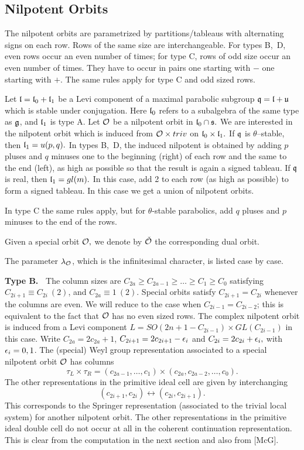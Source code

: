 \documentclass[11pt ,reqno]{amsart}
\begin{document}
\subsection{Nilpotent Orbits}\label{1.3} The nilpotent orbits are parametrized by
partitions/tableaus with alternating signs on each row. Rows of the
same size are interchangeable. For types B,\ D, even rows
occur an even number of times; for type C, rows of odd size occur an
even number of times. They have to occur in pairs one
starting with $-$ one starting with $+.$ The same rules apply for type
C and odd sized rows.

\medskip
Let ${\mathfrak l}={\mathfrak l}_0 + {\mathfrak l}_1$ be a Levi component of a maximal parabolic
subgroup ${\mathfrak q}={\mathfrak l} +{\mathfrak u}$ which is stable under conjugation. Here ${\mathfrak l}_0$
refers to a subalgebra of the same type as ${\mathfrak g}$, and ${\mathfrak l}_1$ is type A. Let $\mathcal O$ be a
nilpotent orbit in ${\mathfrak l}_0\cap {\mathfrak s}.$ We are interested in the nilpotent
orbit which is induced from $\mathcal O\times triv$ on ${\mathfrak l}_0\times{\mathfrak l}_1.$ If ${\mathfrak q}$ is
$\theta$--stable, then ${\mathfrak l}_1=u(p,q).$ In types B,\ D, the induced
nilpotent is obtained by adding $p$ pluses and $q$ minuses one to the
beginning (right) of  each row and the same to the end (left), as high as possible so
that the result is again a signed tableau. If ${\mathfrak q}$ is real, then
${\mathfrak l}_1=gl(m).$ In this case, add 2 to each row (as high as possible) to
form a signed tableau. In this case we get a union of nilpotent orbits.

In type C the same rules apply, but for $\theta$-stable parabolics,
add $q$ pluses and $p$ minuses to the end of the rows.

\medskip
Given a special orbit $\mathcal O,$ we denote by ${\check {\mathcal O}}$ the corresponding dual orbit.


\medskip
The parameter ${\lambda}_{{\mathcal O}}$, which is the infinitesimal character, is listed case by case. 

\bigskip
\noindent\textbf{Type B.\ } The column sizes are $C_{2a}\ge
C_{2a-1}\ge \dots \ge C_1\ge C_0$ satisfying $C_{2i+1}\equiv C_{2i}\
(2)$, and $C_{2a}\equiv 1\ (2).$ 
Special orbits satisfy $C_{2i+1}=C_{2i}$ whenever the columns are even. We
will reduce to the case when  $C_{2i-1}=C_{2i-2}$; this is equivalent to
the fact that ${\mathcal O}$ has no even sized rows. {The complex nilpotent
orbit is induced from a Levi component $L=SO(2n+1-C_{2i-1})\times
GL(C_{2i-1})$ in this case}. Write $C_{2a}=2c_{2a}+1$,
$C_{2i+1}=2c_{2i+1}-{\epsilon}_{i}$ and  $C_{2i}=2c_{2i}+{\epsilon}_{i},$ with
${\epsilon}_i=0,1$. The (special) Weyl
group representation associated to a special nilpotent orbit ${\mathcal O}$
has columns
\begin{equation}
  \label{eq:tableaub}
\tau_L\times\tau_R=(c_{2a-1},\dots ,c_1)\times (c_{2a},c_{2a-2},\dots ,c_0).  
\end{equation}
The other representations in the primitive ideal cell are given by
interchanging 
$$
(c_{2i+1}, c_{2i})\longleftrightarrow
(c_{2i},c_{2i+1}).
$$  
This corresponds to the Springer representation
(associated to the trivial local system) for another nilpotent orbit.
The other representations in the primitive ideal double cell do not
occur at all in the coherent continuation representation. This is
clear from the computation in the next section and also from [McG].  
\end{document}
